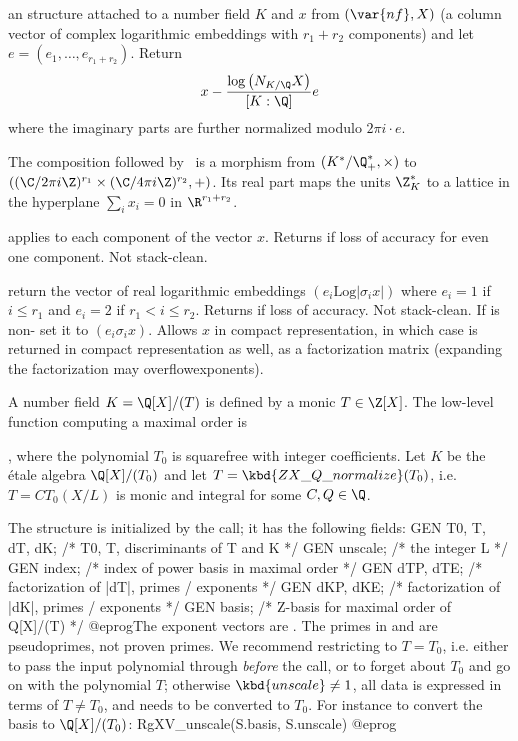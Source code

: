  an  structure
attached to a number field $K$ and $x$ from $(\var{nf}, X)$
(a column vector of complex logarithmic embeddings with $r_1 + r_2$
components) and let $e = (e_1,\dots,e_{r_1+r_2})$.
Return
$$ x - \dfrac{\log \big(N_{K/\Q} X\big)}{[K:\Q]} e $$
where the imaginary parts are further normalized modulo $2\pi i \cdot e$.

The composition  followed by~ is a
morphism from $(K^*/\Q_+^*, \times)$ to
$((\C/2\pi i\Z)^{r_1} \times (\C/4\pi i\Z)^{r_2}, +)$.
Its real part maps the units $\Z_K^*$ to a lattice in the hyperplane
$\sum_i x_i = 0$ in $\R^{r_1+r_2}$.

 applies 
to each component of the vector $x$. Returns  if loss of
accuracy for even one component. Not stack-clean.

return the vector of real logarithmic embeddings $(e_i \text{Log}|\sigma_i x|)$
where $e_i = 1$ if $i \leq r_1$ and $e_i = 2$ if $r_1 < i \leq r_2$. Returns
 if loss of accuracy. Not stack-clean. If 
is non- set it to $(e_i \sigma_i x)$.
Allows $x$ in compact representation, in which case  is returned
in compact representation as well, as a factorization matrix (expanding the
factorization may overflowexponents).


A number field $K = \Q[X]/(T)$ is defined by a monic $T\in\Z[X]$. The
low-level function computing a maximal order is

, where
the polynomial $T_0$ is squarefree with integer coefficients. Let $K$ be the
\'etale algebra $\Q[X]/(T_0)$ and let $T = \kbd{ZX\_Q\_normalize}(T_0)$,
i.e. $T = C T_0(X/L)$ is monic and integral for some $C,Q\in \Q$.

The structure  is initialized by the call; it has the
following fields:
\bprog
  GEN T0, T, dT, dK; /* T0, T, discriminants of T and K */
  GEN unscale; /* the integer L */
  GEN index; /* index of power basis in maximal order */
  GEN dTP, dTE; /* factorization of |dT|, primes / exponents */
  GEN dKP, dKE; /* factorization of |dK|, primes / exponents */
  GEN basis; /* Z-basis for maximal order of Q[X]/(T) */
@eprog\noindent The exponent vectors are . The primes
in  and  are pseudoprimes, not proven primes. We recommend
restricting to $T = T_0$, i.e. either to pass the input polynomial through
 \emph{before} the call, or to forget about $T_0$
and go on with the polynomial $T$; otherwise $\kbd{unscale}\neq 1$, all data
is expressed in terms of $T\neq T_0$, and needs to be converted to $T_0$. For
instance to convert the basis to $\Q[X]/(T_0)$:
\bprog
  RgXV_unscale(S.basis, S.unscale)
@eprog


